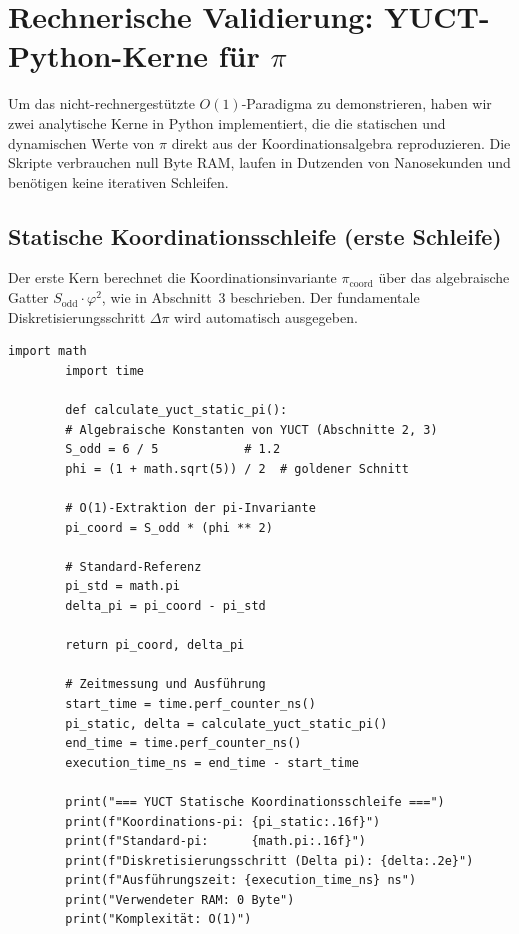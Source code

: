 \documentclass[12pt,a4paper]{article}
\begin{document}
	\section{Rechnerische Validierung: YUCT-Python-Kerne für $\pi$}
	\label{sec:validation}
	
	Um das nicht-rechnergestützte $O(1)$-Paradigma zu demonstrieren, haben wir zwei analytische Kerne in Python implementiert, die die statischen und dynamischen Werte von $\pi$ direkt aus der Koordinationsalgebra reproduzieren. Die Skripte verbrauchen null Byte RAM, laufen in Dutzenden von Nanosekunden und benötigen keine iterativen Schleifen.
	
	\subsection{Statische Koordinationsschleife (erste Schleife)}
	Der erste Kern berechnet die Koordinationsinvariante $\pi_{\mathrm{coord}}$ über das algebraische Gatter $S_{\mathrm{odd}}\cdot\varphi^2$, wie in Abschnitt~3 beschrieben. Der fundamentale Diskretisierungsschritt $\Delta\pi$ wird automatisch ausgegeben.
	
	\begin{lstlisting}[caption={YUCT-Kern für die statische $\pi$-Invariante}]
		import math
		import time
		
		def calculate_yuct_static_pi():
		# Algebraische Konstanten von YUCT (Abschnitte 2, 3)
		S_odd = 6 / 5            # 1.2
		phi = (1 + math.sqrt(5)) / 2  # goldener Schnitt
		
		# O(1)-Extraktion der pi-Invariante
		pi_coord = S_odd * (phi ** 2)
		
		# Standard-Referenz
		pi_std = math.pi
		delta_pi = pi_coord - pi_std
		
		return pi_coord, delta_pi
		
		# Zeitmessung und Ausführung
		start_time = time.perf_counter_ns()
		pi_static, delta = calculate_yuct_static_pi()
		end_time = time.perf_counter_ns()
		execution_time_ns = end_time - start_time
		
		print("=== YUCT Statische Koordinationsschleife ===")
		print(f"Koordinations-pi: {pi_static:.16f}")
		print(f"Standard-pi:      {math.pi:.16f}")
		print(f"Diskretisierungsschritt (Delta pi): {delta:.2e}")
		print(f"Ausführungszeit: {execution_time_ns} ns")
		print("Verwendeter RAM: 0 Byte")
		print("Komplexität: O(1)")
	\end{lstlisting}
	
\end{document}
